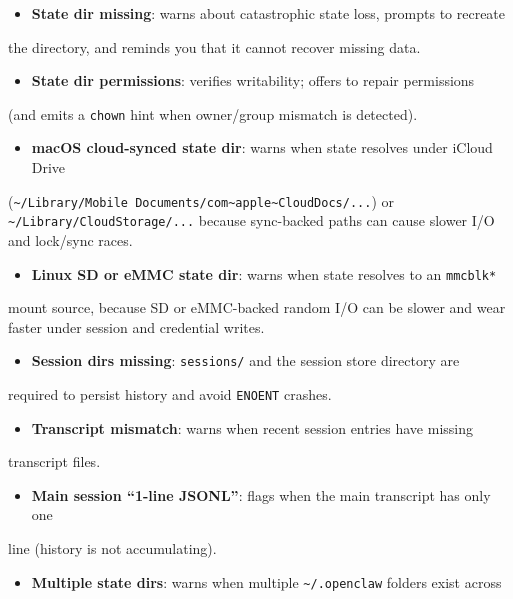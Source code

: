\begin{itemize}
  \item \textbf{State dir missing}: warns about catastrophic state loss, prompts to recreate
\end{itemize}

the directory, and reminds you that it cannot recover missing data.
\begin{itemize}
  \item \textbf{State dir permissions}: verifies writability; offers to repair permissions
\end{itemize}

(and emits a \texttt{chown} hint when owner/group mismatch is detected).
\begin{itemize}
  \item \textbf{macOS cloud-synced state dir}: warns when state resolves under iCloud Drive
\end{itemize}

(\texttt{\textasciitilde{}/Library/Mobile Documents/com\textasciitilde{}apple\textasciitilde{}CloudDocs/...}) or
\texttt{\textasciitilde{}/Library/CloudStorage/...} because sync-backed paths can cause slower I/O
and lock/sync races.
\begin{itemize}
  \item \textbf{Linux SD or eMMC state dir}: warns when state resolves to an \texttt{mmcblk*}
\end{itemize}

mount source, because SD or eMMC-backed random I/O can be slower and wear
faster under session and credential writes.
\begin{itemize}
  \item \textbf{Session dirs missing}: \texttt{sessions/} and the session store directory are
\end{itemize}

required to persist history and avoid \texttt{ENOENT} crashes.
\begin{itemize}
  \item \textbf{Transcript mismatch}: warns when recent session entries have missing
\end{itemize}

transcript files.
\begin{itemize}
  \item \textbf{Main session “1-line JSONL”}: flags when the main transcript has only one
\end{itemize}

line (history is not accumulating).
\begin{itemize}
  \item \textbf{Multiple state dirs}: warns when multiple \texttt{\textasciitilde{}/.openclaw} folders exist across
\end{itemize}

